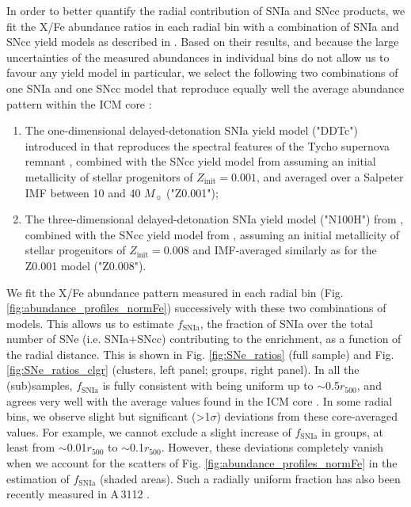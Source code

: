\documentclass{aa}
\begin{document}
In order to better quantify the radial contribution of SNIa and SNcc products, we fit the X/Fe abundance ratios in each radial bin with a combination of SNIa and SNcc yield models as described in \citet{2016A&A...595A.126M}. Based on their results, and because the large uncertainties of the measured abundances in individual bins do not allow us to favour any yield model in particular, we select the following two combinations of one SNIa and one SNcc model that reproduce equally well the average abundance pattern within the ICM core \citep[$0.2 r_{500}$ or $0.05 r_{500}$;][]{2016A&A...595A.126M}:
\begin{enumerate}

\item The one-dimensional delayed-detonation SNIa yield model ("DDTc") introduced in \citet{2005ApJ...624..198B} that reproduces the spectral features of the Tycho supernova remnant \citep{2006ApJ...645.1373B}, combined with the SNcc yield model from \citet{2013ARA&A..51..457N} assuming an initial metallicity of stellar progenitors of $Z_\text{init} = 0.001$, and averaged over a Salpeter IMF \citep{1955ApJ...121..161S} between 10 and 40 $M_\sun$ ("Z0.001");

\item The three-dimensional delayed-detonation SNIa yield model ("N100H") from \citet{2013MNRAS.429.1156S}, combined with the SNcc yield model from \citet{2013ARA&A..51..457N}, assuming an initial metallicity of stellar progenitors of $Z_\text{init} = 0.008$ and IMF-averaged similarly as for the Z0.001 model ("Z0.008").

\end{enumerate}
We fit the X/Fe abundance pattern measured in each radial bin (Fig. \ref{fig:abundance_profiles_normFe}) successively with these two combinations of models. This allows us to estimate $f_\text{SNIa}$, the fraction of SNIa over the total number of SNe (i.e. SNIa+SNcc) contributing to the enrichment, as a function of the radial distance. This is shown in Fig. \ref{fig:SNe_ratios} (full sample) and Fig. \ref{fig:SNe_ratios_clgr} (clusters, left panel; groups, right panel). In all the (sub)samples, $f_\text{SNIa}$ is fully consistent with being uniform up to $\sim$0.5$r_{500}$, and agrees very well with the average values found in the ICM core \citep[][dotted horizontal lines in the figures]{2016A&A...595A.126M}. In some radial bins, we observe slight but significant (>1$\sigma$) deviations from these core-averaged values. For example, we cannot exclude a slight increase of $f_\text{SNIa}$ in groups, at least from $\sim$0.01$r_{500}$ to $\sim$0.1$r_{500}$. However, these deviations completely vanish when we account for the scatters of Fig. \ref{fig:abundance_profiles_normFe} in the estimation of $f_\text{SNIa}$ (shaded areas). Such a radially uniform fraction has also been recently measured in A\,3112 \citep{2016arXiv160903581E}.
\end{document}
